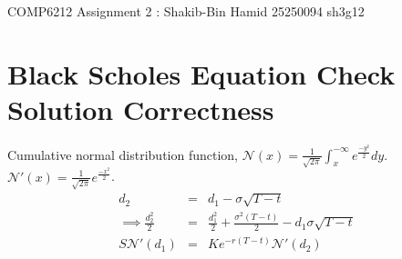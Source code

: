 \documentclass[11pt]{article}
\begin{document}
\begin{center}

\Large{COMP6212 Assignment 2 : Shakib-Bin Hamid 25250094 sh3g12}

\end{center}

\section{Black Scholes Equation Check Solution Correctness}

Cumulative normal distribution function, $\mathcal{N}(x) = \frac{1}{\sqrt{2\pi}} \int_x^{-\infty} e^{\frac{-y^2}{2}}dy$. $\mathcal{N}'(x) = \frac{1}{\sqrt{2\pi}}e^{\frac{-x^2}{2}}$.\\

\begin{eqnarray*}
d_2 &=& d_1 - \sigma\sqrt{T-t} \\
\implies \frac{d_2^2}{2} &=& \frac{d_1^2}{2} + \frac{\sigma^2(T-t)}{2} - d_1\sigma\sqrt{T-t}\\
 S\mathcal{N}'(d_1) &=& Ke^{-r(T-t)}\mathcal{N}'(d_2) 
\end{eqnarray*}
\end{document}
